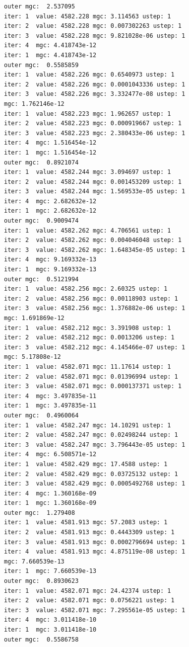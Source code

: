 \documentclass[
  letterpaper,
  DIV=11,
  numbers=noendperiod]{scrartcl}
\begin{document}
\begin{verbatim}
outer mgc:  2.537095 
iter: 1  value: 4582.228 mgc: 3.114563 ustep: 1 
iter: 2  value: 4582.228 mgc: 0.007302263 ustep: 1 
iter: 3  value: 4582.228 mgc: 9.821028e-06 ustep: 1 
iter: 4  mgc: 4.418743e-12 
iter: 1  mgc: 4.418743e-12 
outer mgc:  0.5585859 
iter: 1  value: 4582.226 mgc: 0.6540973 ustep: 1 
iter: 2  value: 4582.226 mgc: 0.0001043336 ustep: 1 
iter: 3  value: 4582.226 mgc: 3.332477e-08 ustep: 1 
mgc: 1.762146e-12 
iter: 1  value: 4582.223 mgc: 1.962657 ustep: 1 
iter: 2  value: 4582.223 mgc: 0.000919667 ustep: 1 
iter: 3  value: 4582.223 mgc: 2.380433e-06 ustep: 1 
iter: 4  mgc: 1.516454e-12 
iter: 1  mgc: 1.516454e-12 
outer mgc:  0.8921074 
iter: 1  value: 4582.244 mgc: 3.094697 ustep: 1 
iter: 2  value: 4582.244 mgc: 0.001453209 ustep: 1 
iter: 3  value: 4582.244 mgc: 1.569533e-05 ustep: 1 
iter: 4  mgc: 2.682632e-12 
iter: 1  mgc: 2.682632e-12 
outer mgc:  0.9009474 
iter: 1  value: 4582.262 mgc: 4.706561 ustep: 1 
iter: 2  value: 4582.262 mgc: 0.004046048 ustep: 1 
iter: 3  value: 4582.262 mgc: 1.648345e-05 ustep: 1 
iter: 4  mgc: 9.169332e-13 
iter: 1  mgc: 9.169332e-13 
outer mgc:  0.5121994 
iter: 1  value: 4582.256 mgc: 2.60325 ustep: 1 
iter: 2  value: 4582.256 mgc: 0.00118903 ustep: 1 
iter: 3  value: 4582.256 mgc: 1.376882e-06 ustep: 1 
mgc: 1.691869e-12 
iter: 1  value: 4582.212 mgc: 3.391908 ustep: 1 
iter: 2  value: 4582.212 mgc: 0.0013206 ustep: 1 
iter: 3  value: 4582.212 mgc: 4.145466e-07 ustep: 1 
mgc: 5.17808e-12 
iter: 1  value: 4582.071 mgc: 11.17614 ustep: 1 
iter: 2  value: 4582.071 mgc: 0.01396994 ustep: 1 
iter: 3  value: 4582.071 mgc: 0.000137371 ustep: 1 
iter: 4  mgc: 3.497835e-11 
iter: 1  mgc: 3.497835e-11 
outer mgc:  0.4960064 
iter: 1  value: 4582.247 mgc: 14.10291 ustep: 1 
iter: 2  value: 4582.247 mgc: 0.02498244 ustep: 1 
iter: 3  value: 4582.247 mgc: 3.796443e-05 ustep: 1 
iter: 4  mgc: 6.508571e-12 
iter: 1  value: 4582.429 mgc: 17.4588 ustep: 1 
iter: 2  value: 4582.429 mgc: 0.03725132 ustep: 1 
iter: 3  value: 4582.429 mgc: 0.0005492768 ustep: 1 
iter: 4  mgc: 1.360168e-09 
iter: 1  mgc: 1.360168e-09 
outer mgc:  1.279408 
iter: 1  value: 4581.913 mgc: 57.2083 ustep: 1 
iter: 2  value: 4581.913 mgc: 0.4443309 ustep: 1 
iter: 3  value: 4581.913 mgc: 0.0002796694 ustep: 1 
iter: 4  value: 4581.913 mgc: 4.875119e-08 ustep: 1 
mgc: 7.660539e-13 
iter: 1  mgc: 7.660539e-13 
outer mgc:  0.8930623 
iter: 1  value: 4582.071 mgc: 24.42374 ustep: 1 
iter: 2  value: 4582.071 mgc: 0.0756221 ustep: 1 
iter: 3  value: 4582.071 mgc: 7.295561e-05 ustep: 1 
iter: 4  mgc: 3.011418e-10 
iter: 1  mgc: 3.011418e-10 
outer mgc:  0.5586758 

\end{verbatim}
\end{document}
